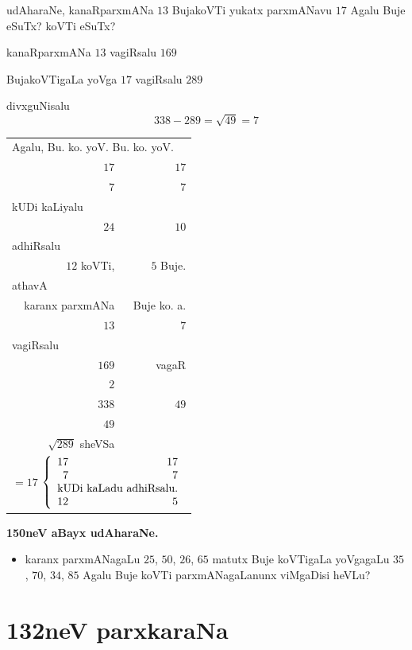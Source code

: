 udAharaNe, kanaRparxmANa $13$ BujakoVTi yukatx parxmANavu $17$ Agalu
Buje eSuTx? koVTi eSuTx?

kanaRparxmANa $13$ vagiRsalu $169$

BujakoVTigaLa yoVga $17$ vagiRsalu $289$

divxguNisalu
$$
338-289=\sqrt{49}=7
$$

\begin{longtable}{r@{\qquad\qquad}r}
\multicolumn{2}{l}{Agalu, Bu. ko. yoV. Bu. ko. yoV.}\\[3pt]
$17$ & $17$\\
$7$ & $7$\\[5pt]
\multicolumn{2}{l}{kUDi kaLiyalu}\\[2pt]
$24$ & $10$\\[5pt]
\multicolumn{2}{l}{adhiRsalu}\\[5pt]
$12$ koVTi, & $5$ Buje.\\[5pt]
\multicolumn{2}{l}{athavA}\\
karanx parxmANa & Buje ko. a.\\
$13$ & $7$\\[5pt]
\multicolumn{2}{l}{vagiRsalu}\\
$169$ & vagaR\\
$2$ & \\
\cline{1-1}
$338$ & $49$\\
$49$ & \\
$\sqrt{289}$ sheVSa\\[.5cm]
\multicolumn{2}{l}{
$=17$
$\left\{
\begin{array}{rr}
17 & 17\\
7 & 7\\
\multicolumn{2}{l}{\text{kUDi kaLadu adhiRsalu.}}\\
12 & 5
\end{array}
\right.$}
\end{longtable}

\begin{center}
{\large\bf 150neV aBayx udAharaNe.}
\end{center}

\begin{itemize}
\item[\rm(1)] karanx parxmANagaLu $25$, $50$, $26$, $65$ matutx Buje
koVTigaLa yoVgagaLu $35$, $70$, $34$, $85$ Agalu Buje koVTi
parxmANagaLanunx viMgaDisi heVLu?
\end{itemize}

\chapter{132neV parxkaraNa}

